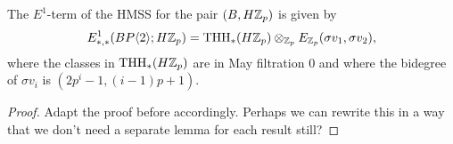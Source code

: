 \begin{comment}
We would also like to record the computation of $E^1$-term in the case $M=H\Z_p$. The proof is essentially the same. Observe that, in this case, the $E^1$-term can be expressed as the homotopy groups of
\[
H\Z_p\wedge_{H\pi_*B}\THH(H\pi_*B)
\]
since $H\pi_*B$ is a commutative ring spectrum. Recall that there are equivalences
\[
\THH(H\pi_*B) \simeq  \THH(H\Z_p\wedge \bbS[v_1,v_2])\simeq \THH(H\Z_p)\wedge \THH(\bbS[v_1,v_2]).
\]
Thus, we can rewrite the $E^1$-term as the homotopy groups of
\[
H\Z_p\wedge_{H\Z_p\wedge \bbS[v_1,v_2]}\left(\THH(H\Z_p)\wedge \THH(\bbS[v_1,v_2])\right).
\]
Noting that $H\Z_p\simeq H\Z_p\wedge \bbS$, we observe that, by commuting colimits with colimits, %
 this is equivalent to 
\[
(H\Z_p\wedge_{H\Z_p} \THH(H\Z_p))\wedge (\bbS\wedge_{\bbS[v_1,v_2]}\THH(\bbS[v_1,v_2]))
\]
which itself is equivalent to 
\[
\THH(H\Z_p)\wedge \THH(\bbS[v_1,v_2];\bbS)\simeq \THH(H\Z_p;H\F_p)\wedge_{H\Z_p}(H\Z_p\wedge \THH(\bbS[v_1,v_2];\bbS))
\]
So we need to compute $H\Z_p \wedge \THH(\bbS[v_1,v_2];\bbS)$. We have a B\"okstedt spectral sequence
\[
HH_*^{\Z_p}((H\Z_p)_*\bbS[v_1,v_2]; (H\Z_p)_*\bbS)\cong HH^{\Z_p}(P_{\Z_p}(v_1,v_2); \Z_p),
\]
because $H\Z_p \wedge \THH(\bbS[v_1,v_2];\bbS)$ is a free $H\Z_p$-algebra, where 
\[ 
HH_*^{\Z_p}(P_{\Z_p}(v_1,v_2); \Z_p) \cong  E_{\Z_p}(\sigma v_1, \sigma v_2)
\]
by Koszul duality. Thus, there is an isomorphism
\[
HH^{\Z_p}_*((H\Z_p)_*(\bbS[v_1,v_2]); (H\Z_p)_*(\bbS)) = E_{\Z_p}(\sigma v_1, \sigma v_2).
\]
\end{comment}
\begin{lem}
	The $E^1$-term of the HMSS for the pair $(B,H\mathbb{Z}_p)$ is given by 
	\[
	E^1_{*,*}(BP\langle 2 \rangle;H\mathbb{Z}_p)= \operatorname{THH}_*(H\mathbb{Z}_p)\otimes_{\mathbb{Z}_p} E_{\mathbb{Z}_p}(\sigma v_1, \sigma v_2), 
	\]
	where the classes in $\operatorname{THH}_*(H\mathbb{Z}_p)$ are in May filtration 0 and where the bidegree of $\sigma v_i$ is $(2p^i-1, (i-1)p+1)$.
\end{lem}
\begin{proof}
Adapt the proof before accordingly. Perhaps we can rewrite this in a way that we don't need a separate lemma for each result still? 
\end{proof}

